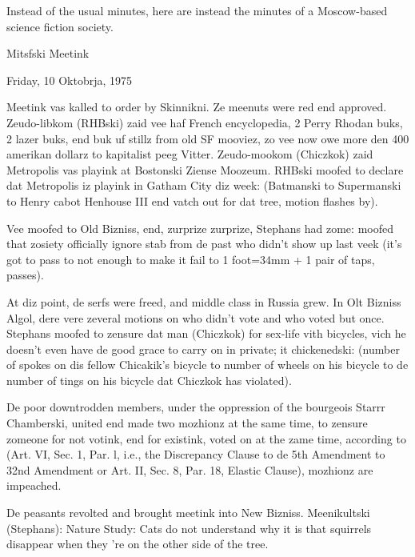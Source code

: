 \documentclass[12pt]{article}
\begin{document}
Instead of the usual minutes, here are instead the minutes of a Moscow-based science fiction society.

\begin{center}

Mitsfski Meetink

Friday, 10 Oktobrja, 1975

\end{center}
 
\vspace{12pt}

\setlength{\parskip}{6pt}

\noindent
Meetink vas kalled to order by Skinnikni. Ze meenuts were red end approved. Zeudo-libkom (RHBski) zaid vee haf French encyclopedia, 2 Perry Rhodan buks, 2 lazer buks, end buk uf stillz from old SF mooviez, zo vee now owe more den 400 amerikan dollarz to kapitalist peeg Vitter. Zeudo-mookom (Chiczkok) zaid Metropolis vas playink at Bostonski Ziense Moozeum. RHBski moofed to declare dat Metropolis iz playink in Gatham City diz week: (Batmanski to Supermanski to Henry cabot Henhouse III end vatch out for dat tree, motion flashes by).

Vee moofed to Old Bizniss, end, zurprize zurprize, Stephans had zome: moofed that zosiety officially ignore stab from de past who didn't show up last veek (it's got to pass to not enough to make it fail to 1 foot=34mm + 1 pair of taps, passes).

At diz point, de serfs were freed, and middle class in Russia grew. In Olt Bizniss Algol, dere vere zeveral motions on who didn't vote and who voted but once. Stephans moofed to zensure dat man (Chiczkok) for sex-life vith bicycles, vich he doesn't even have de good grace to carry on in private; it chickenedski: (number of spokes on dis fellow Chicakik's bicycle to number of wheels on his bicycle to de number of tings on his bicycle dat Chiczkok has violated).

De poor downtrodden members, under the oppression of the bourgeois Starrr Chamberski, united end made two mozhionz at the same time, to zensure zomeone for not votink, end for existink, voted on at the zame time, according to (Art. VI, Sec. 1, Par. l, i.e., the Discrepancy Clause to de 5th Amendment to 32nd Amendment or Art. II, Sec. 8, Par. 18, Elastic Clause), mozhionz are impeached.

De peasants revolted and brought meetink into New Bizniss. Meenikultski (Stephans): Nature Study: Cats do not understand why it is that squirrels disappear when they 're on the other side of the tree.
\end{document}
